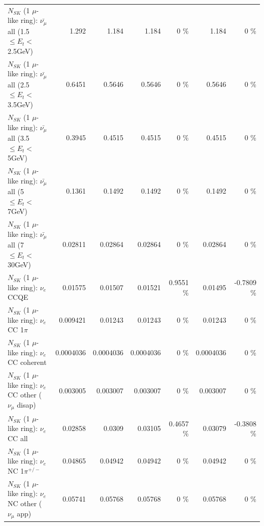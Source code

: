 \begin{table}
\begin{tabular}{| l | r | r | r  r | r  r |}
 $N_{SK}$ (1 $\mu$-like ring): $\bar{\nu_{\mu}}$ all (1.5 $\leq E_{t} <$ 2.5GeV) &           1.292 &           1.184 &           1.184 &        0 \%  &           1.184 &        0 \%  \\ 
 $N_{SK}$ (1 $\mu$-like ring): $\bar{\nu_{\mu}}$ all (2.5 $\leq E_{t} <$ 3.5GeV) &          0.6451 &          0.5646 &          0.5646 &        0 \%  &          0.5646 &        0 \%  \\ 
   $N_{SK}$ (1 $\mu$-like ring): $\bar{\nu_{\mu}}$ all (3.5 $\leq E_{t} <$ 5GeV) &          0.3945 &          0.4515 &          0.4515 &        0 \%  &          0.4515 &        0 \%  \\ 
     $N_{SK}$ (1 $\mu$-like ring): $\bar{\nu_{\mu}}$ all (5 $\leq E_{t} <$ 7GeV) &          0.1361 &          0.1492 &          0.1492 &        0 \%  &          0.1492 &        0 \%  \\ 
    $N_{SK}$ (1 $\mu$-like ring): $\bar{\nu_{\mu}}$ all (7 $\leq E_{t} <$ 30GeV) &         0.02811 &         0.02864 &         0.02864 &        0 \%  &         0.02864 &        0 \%  \\ 
\hline
\hline
\hline
                                      $N_{SK}$ (1 $\mu$-like ring): $\nu_e$ CCQE &         0.01575 &         0.01507 &         0.01521 &   0.9551 \%  &         0.01495 &  -0.7809 \%  \\ 
                                 $N_{SK}$ (1 $\mu$-like ring): $\nu_e$ CC 1$\pi$ &        0.009421 &         0.01243 &         0.01243 &        0 \%  &         0.01243 &        0 \%  \\ 
                               $N_{SK}$ (1 $\mu$-like ring): $\nu_e$ CC coherent &       0.0004036 &       0.0004036 &       0.0004036 &        0 \%  &       0.0004036 &        0 \%  \\ 
                $N_{SK}$ (1 $\mu$-like ring): $\nu_e$ CC other ($\nu_\mu$ disap) &        0.003005 &        0.003007 &        0.003007 &        0 \%  &        0.003007 &        0 \%  \\ 
                                  $N_{SK}$ (1 $\mu$-like ring): $\nu_{e}$ CC all &         0.02858 &          0.0309 &         0.03105 &   0.4657 \%  &         0.03079 &  -0.3808 \%  \\ 
\hline
                           $N_{SK}$ (1 $\mu$-like ring): $\nu_e$ NC 1$\pi^{+/-}$ &         0.04865 &         0.04942 &         0.04942 &        0 \%  &         0.04942 &        0 \%  \\ 
                  $N_{SK}$ (1 $\mu$-like ring): $\nu_e$ NC other ($\nu_\mu$ app) &         0.05741 &         0.05768 &         0.05768 &        0 \%  &         0.05768 &        0 \%  \\ 

\end{tabular}
\end{table}
